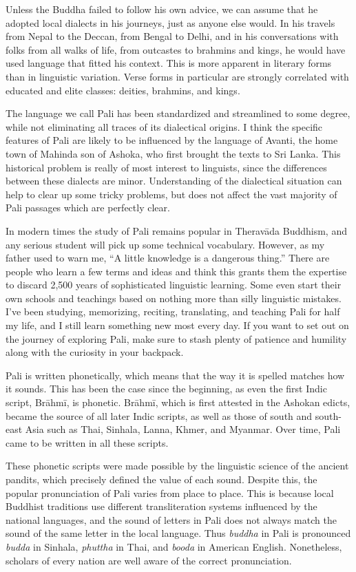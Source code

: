 \documentclass[12pt,openany]{book}%
\begin{document}
Unless the Buddha failed to follow his own advice, we can assume that he adopted local dialects in his journeys, just as anyone else would. In his travels from Nepal to the Deccan, from Bengal to Delhi, and in his conversations with folks from all walks of life, from outcastes to brahmins and kings, he would have used language that fitted his context. This is more apparent in literary forms than in linguistic variation. Verse forms in particular are strongly correlated with educated and elite classes: deities, brahmins, and kings. 

The language we call Pali has been standardized and streamlined to some degree, while not eliminating all traces of its dialectical origins. I think the specific features of Pali are likely to be influenced by the language of Avanti, the home town of Mahinda son of Ashoka, who first brought the texts to Sri Lanka. This historical problem is really of most interest to linguists, since the differences between these dialects are minor. Understanding of the dialectical situation can help to clear up some tricky problems, but does not affect the vast majority of Pali passages which are perfectly clear. 

In modern times the study of Pali remains popular in \textsanskrit{Theravāda} Buddhism, and any serious student will pick up some technical vocabulary. However, as my father used to warn me, “A little knowledge is a dangerous thing.” There are people who learn a few terms and ideas and think this grants them the expertise to discard 2,500 years of sophisticated linguistic learning. Some even start their own schools and teachings based on nothing more than silly linguistic mistakes. I’ve been studying, memorizing, reciting, translating, and teaching Pali for half my life, and I still learn something new most every day. If you want to set out on the journey of exploring Pali, make sure to stash plenty of patience and humility along with the curiosity in your backpack.

Pali is written phonetically, which means that the way it is spelled matches how it sounds. This has been the case since the beginning, as even the first Indic script, \textsanskrit{Brāhmī}, is phonetic. \textsanskrit{Brāhmī}, which is first attested in the Ashokan edicts, became the source of all later Indic scripts, as well as those of south and south-east Asia such as Thai, Sinhala, Lanna, Khmer, and Myanmar. Over time, Pali came to be written in all these scripts.

These phonetic scripts were made possible by the linguistic science of the ancient pandits, which precisely defined the value of each sound. Despite this, the popular pronunciation of Pali varies from place to place. This is because local Buddhist traditions use different transliteration systems influenced by the national languages, and the sound of letters in Pali does not always match the sound of the same letter in the local language. Thus \textit{buddha} in Pali is pronounced \textit{budda} in Sinhala, \textit{phuttha} in Thai, and \textit{booda} in American English. Nonetheless, scholars of every nation are well aware of the correct pronunciation. 
\end{document}
